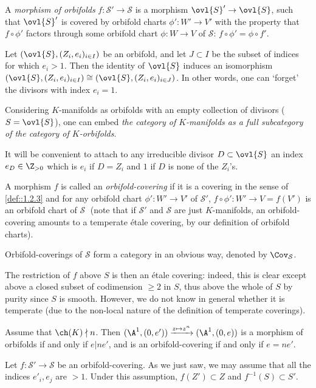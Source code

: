 \begin{para}\label{para::4.4.2} A {\it morphism of orbifolds}
 $f:\mathcal{S}'\to \mathcal{S}$ is a morphism $\ovl{S}'\to \ovl{S}$, such
 that $\ovl{S}'$ is covered by orbifold charts  $\phi': W'\to V'$ with
 the property that $f\circ \phi'$ factors through some orbifold chart
 $\phi:W\to V$ of $\mathcal{S}$: $f\circ \phi'=\phi\circ f'$.

 \medskip{} Let $(\ovl{S}, (Z_i,e_i)_{i\in I})$ be
 an orbifold, and let $J\subset I$ be the subset of indices for which
 $e_i>1$. Then the identity of $\ovl{S}$ induces an isomorphism
 $(\ovl{S}, (Z_i,e_i)_{i\in I})\cong (\ovl{S}, (Z_i,e_i)_{i\in J})$. In
 other words, one can `forget' the divisors with index $e_i=1$.

 \noindent Considering $K$-manifolds as orbifolds with an empty
 collection of divisors ($S=\ovl{S}$), one can embed {\it the category of 
 $K$-manifolds as a full subcategory of the category of $K$-orbifolds}.

\noindent It will be convenient to attach to any irreducible divisor
 $D\subset \ovl{S}$ an index $e_D\in \Z_{>0}$ which is $e_i$ if
 $D=Z_i$ and $1$ if $D$ is none of the $Z_i$'s.
\end{para}

\begin{para}\label{para::4.4.3} A morphism $f$ is called an
{\it orbifold-covering} if it is a covering in the sense of
 \ref{def::1.2.3} and 
 for any orbifold chart $\phi': W'\to V'$ of $\mathcal{S}'$, $f\circ
 \phi': W'\to V=f(V')$ is an orbifold chart of $\mathcal{S}\;$ (note that if
 $\mathcal{S}'$ and $\mathcal{S}$ are just $K$-manifolds, an orbifold-covering
 amounts to a temperate \'etale covering, by our definition of orbifold
 charts).
 
 \noindent Orbifold-coverings of $\mathcal{S}$ form a category in an obvious
 way, denoted by $\Cov_\mathcal{S}$.
 
\medskip\noindent The restriction of $f$ above $S$ is then an \'etale
 covering: indeed, this is clear except above a closed subset of
 codimension $\geq 2$ in $S$, thus above the whole of $S$ by purity since
 $S$ is smooth.
 However, we do not know in general whether it
 is temperate (due to the non-local nature of the definition of
 temperate coverings).
 
\medskip{} Assume that $\ch(K) \nmid n$. Then
 $(\A^1, (0, e')) \xrightarrow{z\mapsto z^n} (\A^1,
 (0, e)) $ is a morphism of orbifolds if and only if $e| ne'$, and is
 an orbifold-covering if and only if $e=ne'$.   

 \medskip {} Let $f:\mathcal{S}'\to \mathcal{S}$ be an
 orbifold-covering. As we just saw, we may assume that all the indices
 $e'_i,e_j$ are $>1$. Under this assumption, $f(Z')\subset Z$ and
$f^{-1}(S)\subset S'$.
\end{para}

